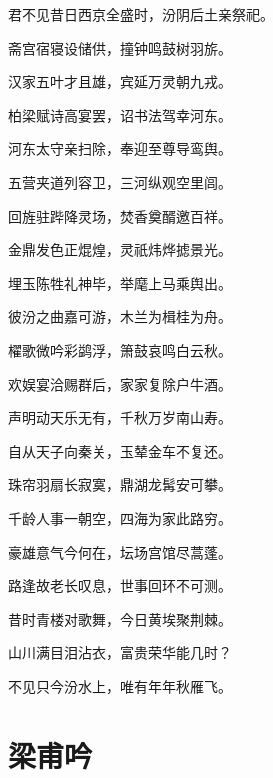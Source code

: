 \documentclass[12pt,UTF-8,openany,fontset=none]{ctexbook}
\begin{document}
    \vspace{18pt}  %

\begin{center}
    \begin{Large}

        君不见昔日西京全盛时，汾阴后土亲祭祀。\hspace{40pt}

        斋宫宿寝设储供，撞钟鸣鼓树羽旂。

        汉家五叶才且雄，宾延万灵朝九戎。

        柏梁赋诗高宴罢，诏书法驾幸河东。

        河东太守亲扫除，奉迎至尊导鸾舆。

        五营夹道列容卫，三河纵观空里闾。

        回旌驻跸降灵场，焚香奠醑邀百祥。

        金鼎发色正焜煌，灵祇炜烨摅景光。

        埋玉陈牲礼神毕，举麾上马乘舆出。

        彼汾之曲嘉可游，木兰为楫桂为舟。

        櫂歌微吟彩鹢浮，箫鼓哀鸣白云秋。

        欢娱宴洽赐群后，家家复除户牛酒。

        声明动天乐无有，千秋万岁南山寿。

        自从天子向秦关，玉辇金车不复还。

        珠帘羽扇长寂寞，鼎湖龙髯安可攀。

        千龄人事一朝空，四海为家此路穷。

        豪雄意气今何在，坛场宫馆尽蒿蓬。

        路逢故老长叹息，世事回环不可测。

        昔时青楼对歌舞，今日黄埃聚荆棘。

        山川满目泪沾衣，富贵荣华能几时？

        不见只今汾水上，唯有年年秋雁飞。

    \end{Large}

\end{center}

\vspace{8pt}
\clearpage

\section{梁甫吟}

\end{document}
